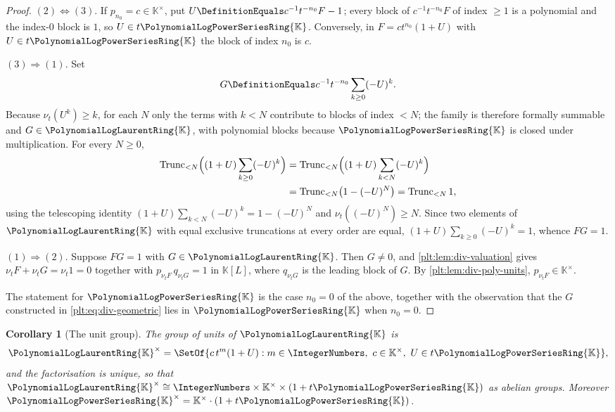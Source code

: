 \documentclass[11pt,oneside]{article}
\theoremstyle{plain}
\newtheorem{corollary}[theorem]{Corollary}
\theoremstyle{definition}
\theoremstyle{remark}
\newcommand{\K}{\mathbb{K}}
\newcommand{\PLpow}{\PolynomialLogPowerSeriesRing{\K}}   %
\newcommand{\PLlau}{\PolynomialLogLaurentRing{\K}}       %
\newcommand{\ordt}{\nu_{t}}                              %
\newcommand{\Trunc}[2]{\operatorname{Trunc}_{<#2}#1}     %
\begin{document}
\begin{proof}
\((2)\Leftrightarrow(3)\).  If \(p_{n_{0}}=c\in\K^{\times}\), put
\(U\DefinitionEquals c^{-1}t^{-n_{0}}F-1\); every block of \(c^{-1}t^{-n_{0}}F\)
of index \(\ge1\) is a polynomial and the index-\(0\) block is \(1\), so
\(U\in t\PLpow\).  Conversely, in \(F=ct^{n_{0}}(1+U)\) with \(U\in t\PLpow\)
the block of index \(n_{0}\) is \(c\).

\((3)\Rightarrow(1)\).  Set
\begin{equation}\label{plt:eq:div-geometric}
  G\DefinitionEquals c^{-1}t^{-n_{0}}\sum_{k\ge0}(-U)^{k}.
\end{equation}
Because \(\ordt(U^{k})\ge k\), for each \(N\) only the terms with \(k<N\)
contribute to blocks of index \(<N\); the family is therefore formally summable
and \(G\in\PLlau\), with polynomial blocks because \(\PLpow\) is closed under
multiplication.  For every \(N\ge0\),
\begin{align*}
  \Trunc{\Bigl((1+U)\sum_{k\ge0}(-U)^{k}\Bigr)}{N}
  &=\Trunc{\Bigl((1+U)\sum_{k<N}(-U)^{k}\Bigr)}{N}\\
  &=\Trunc{\bigl(1-(-U)^{N}\bigr)}{N}
   =\Trunc{1}{N},
\end{align*}
using the telescoping identity \((1+U)\sum_{k<N}(-U)^{k}=1-(-U)^{N}\) and
\(\ordt((-U)^{N})\ge N\).  Since two elements of \(\PLlau\) with equal exclusive
truncations at every order are equal, \((1+U)\sum_{k\ge0}(-U)^{k}=1\), whence
\(FG=1\).

\((1)\Rightarrow(2)\).  Suppose \(FG=1\) with \(G\in\PLlau\).  Then \(G\ne0\),
and \cref{plt:lem:div-valuation} gives \(\ordt F+\ordt G=\ordt 1=0\) together
with \(p_{\ordt F}\,q_{\ordt G}=1\) in \(\K[L]\), where \(q_{\ordt G}\) is the
leading block of \(G\).  By \cref{plt:lem:div-poly-units},
\(p_{\ordt F}\in\K^{\times}\).

The statement for \(\PLpow\) is the case \(n_{0}=0\) of the above, together
with the observation that the \(G\) constructed in \cref{plt:eq:div-geometric}
lies in \(\PLpow\) when \(n_{0}=0\).
\end{proof}

\begin{corollary}[The unit group]\label{plt:cor:div-unit-group}
The group of units of \(\PLlau\) is
\begin{equation}\label{plt:eq:div-unit-group}
  \PLlau^{\times}
  =\SetOf{c\,t^{m}(1+U):m\in\IntegerNumbers,\ c\in\K^{\times},\
          U\in t\PLpow},
\end{equation}
and the factorisation is unique, so that
\(\PLlau^{\times}\cong\IntegerNumbers\times\K^{\times}\times(1+t\PLpow)\) as
abelian groups.  Moreover \(\PLpow^{\times}=\K^{\times}\cdot(1+t\PLpow)\).
\end{corollary}
\end{document}
